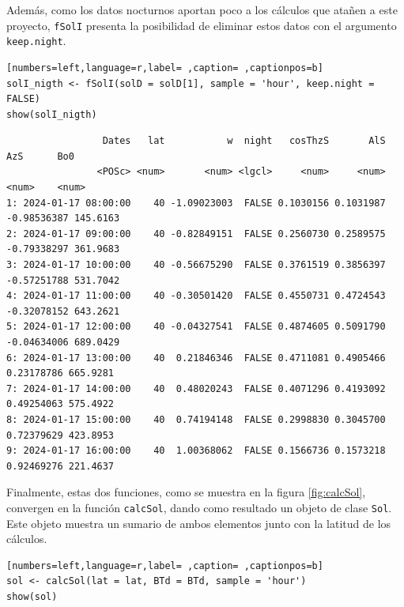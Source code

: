 Además, como los datos nocturnos aportan poco a los cálculos que atañen a este proyecto, \texttt{fSolI} presenta la posibilidad de eliminar estos datos con el argumento \texttt{keep.night}.
\begin{lstlisting}[numbers=left,language=r,label= ,caption= ,captionpos=b]
solI_nigth <- fSolI(solD = solD[1], sample = 'hour', keep.night = FALSE)
show(solI_nigth)
\end{lstlisting}

\begin{verbatim}
                 Dates   lat           w  night   cosThzS       AlS         AzS      Bo0
                <POSc> <num>       <num> <lgcl>     <num>     <num>       <num>    <num>
1: 2024-01-17 08:00:00    40 -1.09023003  FALSE 0.1030156 0.1031987 -0.98536387 145.6163
2: 2024-01-17 09:00:00    40 -0.82849151  FALSE 0.2560730 0.2589575 -0.79338297 361.9683
3: 2024-01-17 10:00:00    40 -0.56675290  FALSE 0.3761519 0.3856397 -0.57251788 531.7042
4: 2024-01-17 11:00:00    40 -0.30501420  FALSE 0.4550731 0.4724543 -0.32078152 643.2621
5: 2024-01-17 12:00:00    40 -0.04327541  FALSE 0.4874605 0.5091790 -0.04634006 689.0429
6: 2024-01-17 13:00:00    40  0.21846346  FALSE 0.4711081 0.4905466  0.23178786 665.9281
7: 2024-01-17 14:00:00    40  0.48020243  FALSE 0.4071296 0.4193092  0.49254063 575.4922
8: 2024-01-17 15:00:00    40  0.74194148  FALSE 0.2998830 0.3045700  0.72379629 423.8953
9: 2024-01-17 16:00:00    40  1.00368062  FALSE 0.1566736 0.1573218  0.92469276 221.4637
\end{verbatim}

Finalmente, estas dos funciones, como se muestra en la figura \ref{fig:calcSol}, convergen en la función \texttt{calcSol}, dando como resultado un objeto de clase \texttt{Sol}. Este objeto muestra un sumario de ambos elementos junto con la latitud de los cálculos.
\begin{lstlisting}[numbers=left,language=r,label= ,caption= ,captionpos=b]
sol <- calcSol(lat = lat, BTd = BTd, sample = 'hour')
show(sol)
\end{lstlisting}

